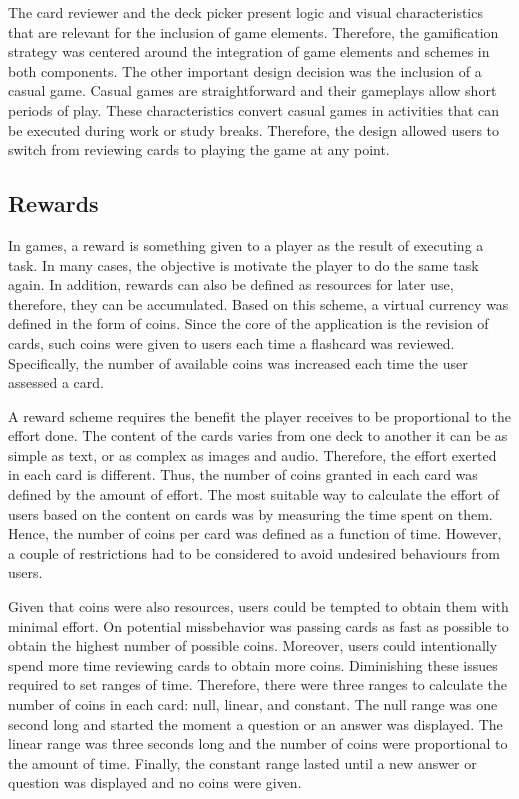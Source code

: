 The card reviewer and the deck picker present logic and visual characteristics that are relevant for the inclusion of game elements. Therefore, the gamification strategy was centered around the integration of game elements and schemes in both components. The other important design decision was the inclusion of a casual game. Casual games are straightforward and their gameplays allow short periods of play. These characteristics convert casual games in activities that can be executed during work or study breaks. Therefore, the design allowed users to switch from reviewing cards to playing the game at any point.

\subsection{Rewards}
In games, a reward is something given to a player as the result of executing a task. In many cases, the objective is motivate the player to do the same task again. In addition, rewards can also be defined as resources for later use, therefore, they can be accumulated. Based on this scheme, a virtual currency was defined in the form of coins. Since the core of the application is the revision of cards, such coins were given to users each time a flashcard was reviewed. Specifically, the number of available coins was increased each time the user assessed a card.

A reward scheme requires the benefit the player receives to be proportional to the effort done. The content of the cards varies from one deck to another it can be as simple as text, or as complex as images and audio. Therefore, the effort exerted in each card is different. Thus, the number of coins granted in each card was defined by the amount of effort. The most suitable way to calculate the effort of users based on the content on cards was by measuring the time spent on them. Hence, the number of coins per card was defined as a function of time. However, a couple of restrictions had to be considered to avoid undesired behaviours from users.

Given that coins were also resources, users could be tempted to obtain them with minimal effort. On potential missbehavior was passing cards as fast as possible to obtain the highest number of possible coins. Moreover, users could intentionally spend more time reviewing cards to obtain more coins. Diminishing these issues required to set ranges of time. Therefore, there were three ranges to calculate the number of coins in each card: null, linear, and constant. The null range was one second long and started the moment a question or an answer was displayed. The linear range was three seconds long and the number of coins were proportional to the amount of time. Finally, the constant range lasted until a new answer or question was displayed and no coins were given.

